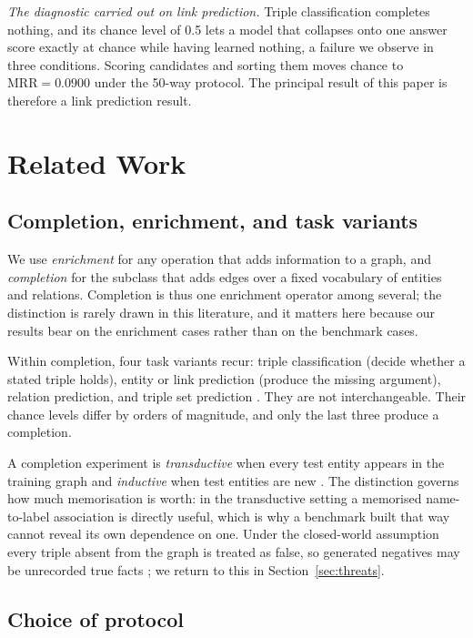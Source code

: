 \documentclass[conference]{IEEEtran}
\begin{document}
\emph{The diagnostic carried out on link prediction.} Triple classification
completes nothing, and its chance level of 0.5 lets a model that collapses onto
one answer score exactly at chance while having learned nothing, a failure we
observe in three conditions. Scoring candidates and sorting them moves chance to
$\mathrm{MRR}=0.0900$ under the 50-way protocol. The principal result of this
paper is therefore a link prediction result.

\section{Related Work}
\label{sec:bg}

\subsection{Completion, enrichment, and task variants}

We use \emph{enrichment} for any operation that adds information to a graph, and
\emph{completion} for the subclass that adds edges over a fixed vocabulary of
entities and relations. Completion is thus one enrichment operator among
several; the distinction is rarely drawn in this literature, and it matters
here because our results bear on the enrichment cases rather than on the
benchmark cases.

Within completion, four task variants recur: triple classification (decide
whether a stated triple holds), entity or link prediction (produce the missing
argument), relation prediction, and triple set prediction \cite{tsp}. They are not
interchangeable. Their chance levels differ by orders of magnitude, and only the
last three produce a completion.

A completion experiment is \emph{transductive} when every test entity appears in
the training graph and \emph{inductive} when test entities are new
\cite{riva2026}. The distinction governs how much memorisation is worth: in the
transductive setting a memorised name-to-label association is directly useful,
which is why a benchmark built that way cannot reveal its own dependence on one.
Under the closed-world assumption every triple absent from the graph is treated
as false, so generated negatives may be unrecorded true facts \cite{shi2018}; we
return to this in Section~\ref{sec:threats}.

\subsection{Choice of protocol}
\label{sec:protocol}
\end{document}
